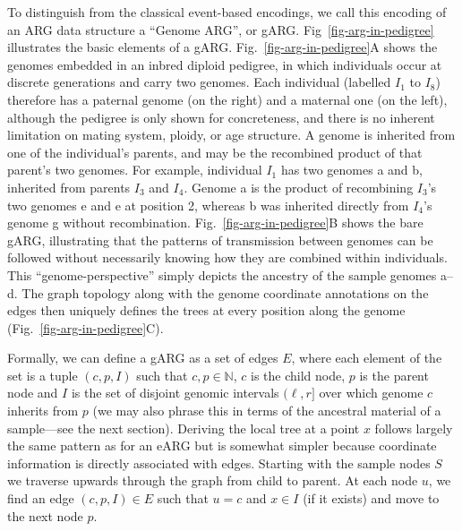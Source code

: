 \documentclass{article}
\begin{document}
To distinguish from the classical event-based encodings,
we call this encoding of an ARG data
structure a ``Genome ARG'', or gARG.
Fig~\ref{fig-arg-in-pedigree} illustrates the basic elements of a gARG.
Fig.~\ref{fig-arg-in-pedigree}A shows the genomes
embedded in an inbred diploid pedigree, in which individuals occur at
discrete generations and carry two genomes. Each individual (labelled
$I_1$ to $I_8$) therefore has a paternal genome (on the right) and a maternal one
(on the left), although the pedigree is only shown for concreteness, and
there is no inherent limitation on mating system, ploidy, or age structure.
A genome is inherited from one of the individual's parents,
and may be the recombined product of that parent's two genomes.
For example, individual $I_1$ has two genomes \textsf{a} and \textsf{b},
inherited from parents $I_3$ and $I_4$. Genome \textsf{a} is the product of
recombining $I_3$'s two genomes \textsf{e} and \textsf{e} at position 2,
whereas \textsf{b} was inherited directly from $I_4$'s genome \textsf{g} without
recombination. Fig.~\ref{fig-arg-in-pedigree}B shows the bare gARG, illustrating
that the patterns of
transmission between genomes can be followed without necessarily knowing
how they are combined within individuals. This ``genome-perspective''
simply depicts the ancestry of the sample genomes \textsf{a}--\textsf{d}. The graph
topology along with the genome coordinate annotations on the
edges then uniquely defines the trees at every position
along the genome (Fig.~\ref{fig-arg-in-pedigree}C).

Formally, we can define a gARG as a set of edges $E$, where each
element of the set is a tuple $(c, p, I)$ such that $c, p \in \mathbb{N}$,
$c$ is the child node, $p$ is the parent node and $I$ is the set of
disjoint genomic intervals $(\ell, r]$ over which genome $c$ inherits from $p$ (we may
also phrase this in terms of the ancestral material of a sample---see
the next section). Deriving the local tree at a point $x$
follows largely the same pattern as for an eARG but is somewhat
simpler because coordinate information is directly associated with
edges. Starting with the sample nodes $S$ we traverse
upwards through the graph from child to parent. At each node $u$, we find an
edge $(c, p, I) \in E$ such that $u = c$ and $x \in I$ (if it
exists) and move to the next node $p$.
\end{document}
